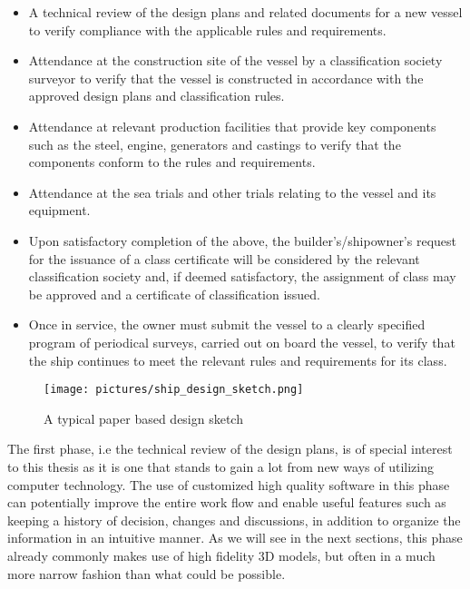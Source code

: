 \begin{itemize}
	\item A technical review of the design plans and related documents for a new vessel to verify compliance with the applicable rules and requirements.
	\item Attendance at the construction site of the vessel by a classification society surveyor to verify that the vessel is 
		  constructed in accordance with the approved design plans and classification rules.
	\item Attendance at relevant production facilities that provide key components such as the steel, engine, generators and castings to verify that the components conform to
		  the rules and requirements.
	\item Attendance at the sea trials and other trials relating to the vessel and its equipment.
	\item Upon satisfactory completion of the above, the builder’s/shipowner’s request for the issuance of a class certificate will be considered by the 
		  relevant classification society and, if deemed satisfactory, the assignment of class may be approved and a certificate of classification issued.
	\item Once in service, the owner must submit the vessel to a clearly specified program of periodical surveys, carried out on board the vessel, 
		  to verify that the ship continues to meet the relevant rules and requirements for its class.
\end{itemize}

\begin{figure}%
	\texttt{[image: pictures/ship\_design\_sketch.png]}
	\caption[A typical paper based design sketch]{A typical paper based design sketch~\cite{MarinoConsult}}
	\label{fig:ship_design_sketch}
\end{figure} 

The first phase, i.e the technical review of the design plans, is of special interest to this thesis as it is one that stands to gain a lot from 
new ways of utilizing computer technology. The use of customized high quality software in this phase can potentially improve the entire work flow and enable useful 
features such as keeping a history of decision, changes and discussions, in addition to organize the information in an intuitive manner. 
As we will see in the next sections, this phase already commonly makes use of high fidelity 3D models, but often in a much more narrow fashion than 
what could be possible. 

